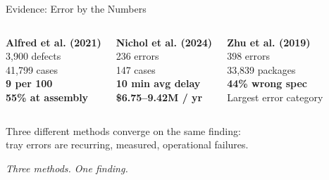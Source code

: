 \documentclass[10pt,aspectratio=169]{beamer}
\newcommand{\takeaway}[1]{%
  \vspace{0.25cm}
  \begin{center}\textit{\small #1}\end{center}
}
\begin{document}

\begin{frame}{Evidence: Error by the Numbers}
  \vspace{0.3cm}
  \begin{columns}[T]
    \begin{block}{\centering\small}
      \textbf{Alfred et al. (2021)} \\[0.2cm]
      3,900 defects \\ 41,799 cases \\[0.2cm]
      \textbf{9 per 100} \\[0.1cm]
      \textbf{55\% at assembly}
    \end{block}
    \begin{block}{\centering\small}
      \textbf{Nichol et al. (2024)} \\[0.2cm]
      236 errors \\ 147 cases \\[0.2cm]
      \textbf{10 min avg delay} \\[0.1cm]
      \textbf{\$6.75--9.42M / yr}
    \end{block}
    \begin{block}{\centering\small}
      \textbf{Zhu et al. (2019)} \\[0.2cm]
      398 errors \\ 33,839 packages \\[0.2cm]
      \textbf{44\% wrong spec} \\[0.1cm]
      Largest error category
    \end{block}
  \end{columns}
  \vspace{0.5cm}
  \begin{center}
    Three different methods converge on the same finding:\\[0.2cm]
    tray errors are recurring, measured, operational failures.
  \end{center}
  \takeaway{Three methods. One finding.}
\end{frame}
\end{document}
